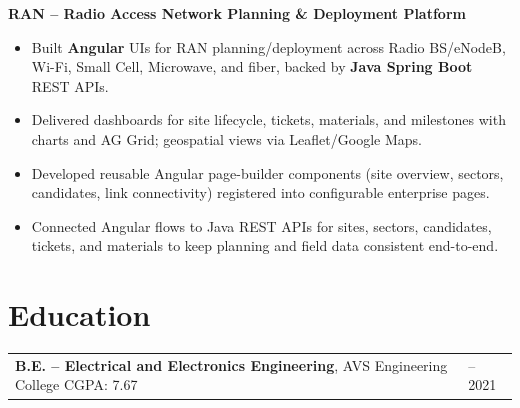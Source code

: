 \documentclass[a4paper,10pt]{article}
\newenvironment{projectblock}[1]
    {
    \textbf{#1}\\[1pt]
    \begin{minipage}[t]{\linewidth}
    \begin{itemize}[nosep, leftmargin=1em, itemsep=1pt,label=--]
    }
    {
    \end{itemize}
    \end{minipage}
    }
\begin{document}
\vspace{2pt}

\begin{projectblock}{RAN -- Radio Access Network Planning \& Deployment Platform}
\item Built \textbf{Angular} UIs for RAN planning/deployment across Radio BS/eNodeB, Wi-Fi, Small Cell, Microwave, and fiber, backed by \textbf{Java Spring Boot} REST APIs.
\item Delivered dashboards for site lifecycle, tickets, materials, and milestones with charts and AG Grid; geospatial views via Leaflet/Google Maps.
\item Developed reusable Angular page-builder components (site overview, sectors, candidates, link connectivity) registered into configurable enterprise pages.
\item Connected Angular flows to Java REST APIs for sites, sectors, candidates, tickets, and materials to keep planning and field data consistent end-to-end.
\end{projectblock}


\section{\textbf{Education}}

\begin{tabularx}{\linewidth}{@{}>{\raggedright\arraybackslash}X >{\raggedleft\arraybackslash}p{2.4cm}@{}}
\textbf{B.E. -- Electrical and Electronics Engineering}, AVS Engineering College \quad CGPA: 7.67 & 2017 -- 2021 \\
\end{tabularx}
\end{document}

